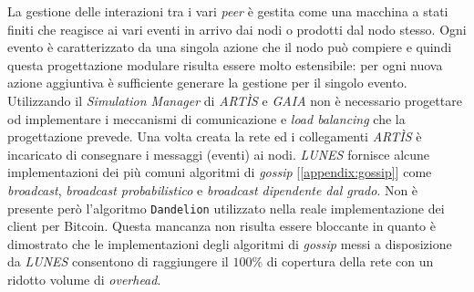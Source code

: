 La gestione delle interazioni tra i vari \textit{peer} è gestita come una macchina a stati finiti che reagisce ai vari eventi in arrivo dai nodi o prodotti dal nodo stesso. Ogni evento è caratterizzato da una singola azione che il nodo può compiere e quindi questa progettazione modulare risulta essere molto estensibile: per ogni nuova azione aggiuntiva è sufficiente generare la gestione per il singolo evento.\newline
Utilizzando il \textit{Simulation Manager} di \textit{ARTÌS} e \textit{GAIA} non è necessario progettare od implementare i meccanismi di comunicazione e \textit{load balancing} che la progettazione prevede. Una volta creata la rete ed i collegamenti \textit{ARTÌS} è incaricato di consegnare i messaggi (eventi) ai nodi.\newline
\textit{LUNES} fornisce alcune implementazioni dei più comuni algoritmi di \textit{gossip} [\ref{appendix:gossip}] come \textit{broadcast}, \textit{broadcast probabilistico} e \textit{broadcast dipendente dal grado}. Non è presente però l'algoritmo \texttt{Dandelion} utilizzato nella reale implementazione dei client per Bitcoin. Questa mancanza non risulta essere bloccante in quanto è dimostrato\cite{gdalunes} che le implementazioni degli algoritmi di \textit{gossip} messi a disposizione da \textit{LUNES} consentono di raggiungere il $100\%$ di copertura della rete con un ridotto volume di \textit{overhead}.

